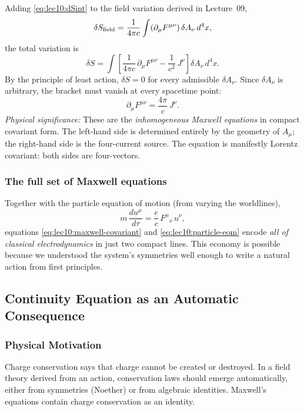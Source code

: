 Adding \eqref{eq:lec10:dSint} to the field variation derived in Lecture~09,
\begin{equation}\label{eq:lec10:dSfield}
  \delta S_{\rm field}
  =
  \frac{1}{4\pi c}\int(\partial_\mu F^{\mu\nu})\,\delta A_\nu\,d^4x ,
\end{equation}
the total variation is
\begin{equation}\label{eq:lec10:dS-total}
  \delta S
  =
  \int\!\left[
    \frac{1}{4\pi c}\,\partial_\mu F^{\mu\nu}
    -\frac{1}{c^2}\,J^\nu
  \right]\delta A_\nu\,d^4x .
\end{equation}
By the principle of least action, $\delta S=0$ for every admissible $\delta A_\nu$.  Since $\delta A_\nu$
is arbitrary, the bracket must vanish at every spacetime point:
\begin{equation}\label{eq:lec10:maxwell-covariant}
  \boxed{
  \partial_\mu F^{\mu\nu}
  =
  \frac{4\pi}{c}\,J^\nu .
  }
\end{equation}
\textit{Physical significance:} These are the \emph{inhomogeneous Maxwell equations} in compact covariant
form.  The left-hand side is determined entirely by the geometry of $A_\mu$; the right-hand side is the
four-current source.  The equation is manifestly Lorentz covariant: both sides are four-vectors.

\subsubsection*{The full set of Maxwell equations}

Together with the particle equation of motion (from varying the worldlines),
\begin{equation}\label{eq:lec10:particle-eom}
  \boxed{
  m\,\frac{du^\mu}{d\tau}
  =
  \frac{e}{c}\,F^\mu{}_\nu\,u^\nu ,
  }
\end{equation}
equations \eqref{eq:lec10:maxwell-covariant} and \eqref{eq:lec10:particle-eom} encode \emph{all of
classical electrodynamics} in just two compact lines.  This economy is possible because we understood
the system's symmetries well enough to write a natural action from first principles.

\subsection{Continuity Equation as an Automatic Consequence}\label{subsec:lec10-continuity}

\subsubsection*{Physical Motivation}
Charge conservation says that charge cannot be created or destroyed.  In a field theory derived from
an action, conservation laws should emerge automatically, either from symmetries (Noether) or from
algebraic identities.  Maxwell's equations contain charge conservation as an identity.

